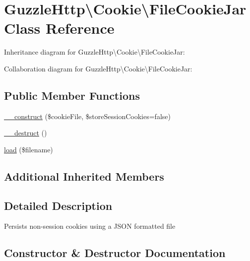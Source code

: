 \hypertarget{classGuzzleHttp_1_1Cookie_1_1FileCookieJar}{}\section{Guzzle\+Http\textbackslash{}Cookie\textbackslash{}File\+Cookie\+Jar Class Reference}
\label{classGuzzleHttp_1_1Cookie_1_1FileCookieJar}


Inheritance diagram for Guzzle\+Http\textbackslash{}Cookie\textbackslash{}File\+Cookie\+Jar\+:


Collaboration diagram for Guzzle\+Http\textbackslash{}Cookie\textbackslash{}File\+Cookie\+Jar\+:
\subsection*{Public Member Functions}
\begin{DoxyCompactItemize}
\item 
\hyperlink{classGuzzleHttp_1_1Cookie_1_1FileCookieJar_a8de6441aa65bb7239b937fa4a5a86ac9}{\+\_\+\+\_\+construct} (\$cookie\+File, \$store\+Session\+Cookies=false)
\item 
\hyperlink{classGuzzleHttp_1_1Cookie_1_1FileCookieJar_ab59b406349779cc58e08597041470c65}{\+\_\+\+\_\+destruct} ()
\item 
\hyperlink{classGuzzleHttp_1_1Cookie_1_1FileCookieJar_a32ce9367ac7ec7f7f2d9e50dfba6496b}{load} (\$filename)
\end{DoxyCompactItemize}
\subsection*{Additional Inherited Members}


\subsection{Detailed Description}
Persists non-\/session cookies using a J\+S\+ON formatted file 

\subsection{Constructor \& Destructor Documentation}
\mbox{\label{classGuzzleHttp_1_1Cookie_1_1FileCookieJar_a8de6441aa65bb7239b937fa4a5a86ac9}} 
